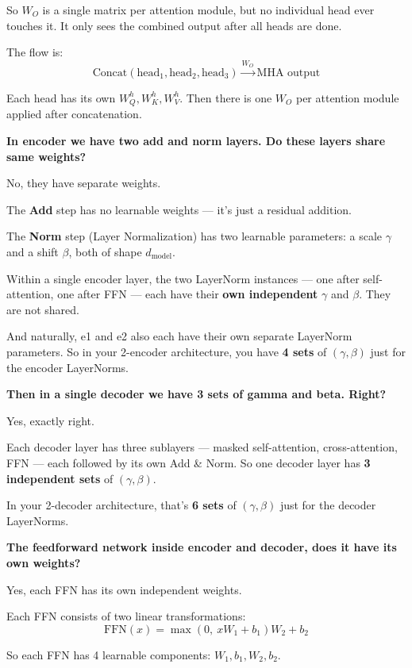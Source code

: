 So $W_O$ is a single matrix per attention module, but no individual head ever touches it. It only sees the combined output after all heads are done.

The flow is:
\[
\text{Concat}(\text{head}_1, \text{head}_2, \text{head}_3) \xrightarrow{W_O} \text{MHA output}
\]

Each head has its own $W_Q^h, W_K^h, W_V^h$. Then there is one $W_O$ per attention module applied after concatenation.

\bigskip

\textbf{In encoder we have two add and norm layers. Do these layers share same weights?}

No, they have separate weights.

The \textbf{Add} step has no learnable weights --- it's just a residual addition.

The \textbf{Norm} step (Layer Normalization) has two learnable parameters: a scale $\gamma$ and a shift $\beta$, both of shape $d_{\text{model}}$.

Within a single encoder layer, the two LayerNorm instances --- one after self-attention, one after FFN --- each have their \textbf{own independent} $\gamma$ and $\beta$. They are not shared.

And naturally, e1 and e2 also each have their own separate LayerNorm parameters. So in your 2-encoder architecture, you have \textbf{4 sets} of $(\gamma, \beta)$ just for the encoder LayerNorms.

\bigskip

\textbf{Then in a single decoder we have 3 sets of gamma and beta. Right?}

Yes, exactly right.

Each decoder layer has three sublayers --- masked self-attention, cross-attention, FFN --- each followed by its own Add \& Norm. So one decoder layer has \textbf{3 independent sets} of $(\gamma, \beta)$.

In your 2-decoder architecture, that's \textbf{6 sets} of $(\gamma, \beta)$ just for the decoder LayerNorms.

\bigskip

\textbf{The feedforward network inside encoder and decoder, does it have its own weights?}

Yes, each FFN has its own independent weights.

Each FFN consists of two linear transformations:
\[
\text{FFN}(x) = \max(0,\ xW_1 + b_1)W_2 + b_2
\]

So each FFN has 4 learnable components: $W_1, b_1, W_2, b_2$.

